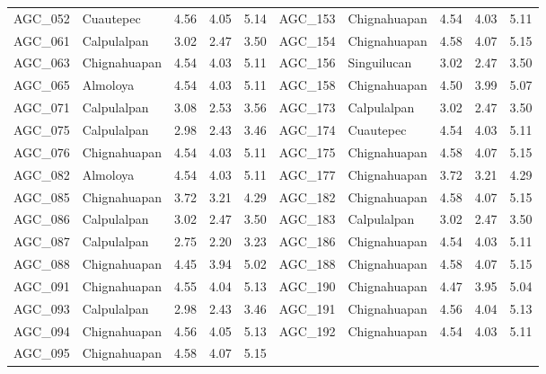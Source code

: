 \documentclass[10pt,letterpaper]{article}
\begin{document}
\begin{minipage}{\textwidth}
\begin{tabular}{@{}llrrr@{\hspace{10pt}}llrrr@{}}
AGC\_052 & Cuautepec & 4.56 & 4.05 & 5.14 & AGC\_153 & Chignahuapan & 4.54 & 4.03 & 5.11 \\
AGC\_061 & Calpulalpan & 3.02 & 2.47 & 3.50 & AGC\_154 & Chignahuapan & 4.58 & 4.07 & 5.15 \\
AGC\_063 & Chignahuapan & 4.54 & 4.03 & 5.11 & AGC\_156 & Singuilucan & 3.02 & 2.47 & 3.50 \\
AGC\_065 & Almoloya & 4.54 & 4.03 & 5.11 & AGC\_158 & Chignahuapan & 4.50 & 3.99 & 5.07 \\
AGC\_071 & Calpulalpan & 3.08 & 2.53 & 3.56 & AGC\_173 & Calpulalpan & 3.02 & 2.47 & 3.50 \\
AGC\_075 & Calpulalpan & 2.98 & 2.43 & 3.46 & AGC\_174 & Cuautepec & 4.54 & 4.03 & 5.11 \\
AGC\_076 & Chignahuapan & 4.54 & 4.03 & 5.11 & AGC\_175 & Chignahuapan & 4.58 & 4.07 & 5.15 \\
AGC\_082 & Almoloya & 4.54 & 4.03 & 5.11 & AGC\_177 & Chignahuapan & 3.72 & 3.21 & 4.29 \\
AGC\_085 & Chignahuapan & 3.72 & 3.21 & 4.29 & AGC\_182 & Chignahuapan & 4.58 & 4.07 & 5.15 \\
AGC\_086 & Calpulalpan & 3.02 & 2.47 & 3.50 & AGC\_183 & Calpulalpan & 3.02 & 2.47 & 3.50 \\
AGC\_087 & Calpulalpan & 2.75 & 2.20 & 3.23 & AGC\_186 & Chignahuapan & 4.54 & 4.03 & 5.11 \\
AGC\_088 & Chignahuapan & 4.45 & 3.94 & 5.02 & AGC\_188 & Chignahuapan & 4.58 & 4.07 & 5.15 \\
AGC\_091 & Chignahuapan & 4.55 & 4.04 & 5.13 & AGC\_190 & Chignahuapan & 4.47 & 3.95 & 5.04 \\
AGC\_093 & Calpulalpan & 2.98 & 2.43 & 3.46 & AGC\_191 & Chignahuapan & 4.56 & 4.04 & 5.13 \\
AGC\_094 & Chignahuapan & 4.56 & 4.05 & 5.13 & AGC\_192 & Chignahuapan & 4.54 & 4.03 & 5.11 \\
AGC\_095 & Chignahuapan & 4.58 & 4.07 & 5.15 &  & & & &  \\

\bottomrule
\end{tabular}
\end{minipage}
\end{document}
